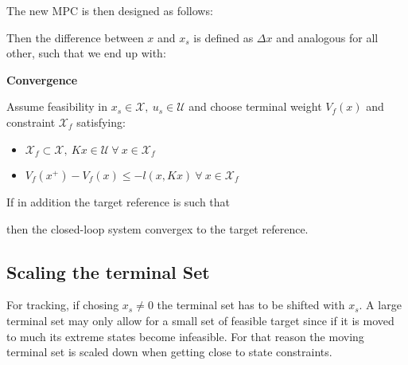 \documentclass[8pt,a4paper]{scrartcl}
\begin{document}
\begin{multicols*}{3}
The new MPC is then designed as follows:


Then the difference between $x$ and $x_s$ is defined as $\Delta x$ and analogous for all other, such that we end up with:


\textbf{Convergence}

\finn

Assume feasibility in $x_s\in\mathcal{X},\ u_s\in\mathcal{U}$ and choose terminal weight $V_f(x)$ and constraint $\mathcal{X}_f$ satisfying:

\begin{itemize}
\ncompaq
\item $\mathcal{X}_f\subset\mathcal{X},\ Kx\in\mathcal{U}\ \forall\ x\in\mathcal{X}_f$
\item $V_f(x^+)-V_f(x)\leq -l(x,Kx)\ \forall\ x\in\mathcal{X}_f$
\end{itemize}

If in addition the target reference is such that


then the closed-loop system convergex to the target reference.

\subsection{Scaling the terminal Set}

For tracking, if chosing $x_s\neq 0$ the terminal set has to be shifted with $x_s$. A large terminal set may only allow for a small set of feasible target since if it is moved to much its extreme states become infeasible. For that reason the moving terminal set is scaled down when getting close to state constraints.


\end{multicols*}
\end{document}
